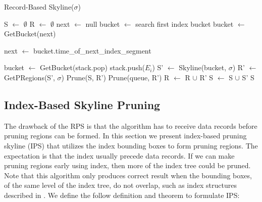 \begin{algorithm}[t]
\caption{Record-Based Skyline($\sigma$)} \label{alg:RBSkyline}
\begin{algorithmic}[1]

\STATE S $\gets$ $\emptyset$
\STATE R $\gets$ $\emptyset$
\REPEAT
    \STATE next $\gets$ null
        \STATE bucket $\gets$ search first index bucket
    \ELSE
        \STATE bucket $\gets$ GetBucket(next)
    \ENDIF

        \STATE next $\gets$ bucket.time\_of\_next\_index\_segment
    \ENDIF

            \STATE bucket $\gets$ GetBucket(stack.pop)
        \ENDIF
                    \STATE stack.push($E_i$)
                \ENDIF
            \ENDFOR
        \ELSE
            \STATE S' $\gets$ Skyline(bucket, $\sigma$)
            \STATE R' $\gets$ GetPRegions(S', $\sigma$)
            \STATE Prune(S, R')
            \STATE Prune(queue, R')
            \STATE R $\gets$ R $\cup$ R'
            \STATE S $\gets$ S $\cup$ S'
        \ENDIF
    \ENDWHILE
{}
\RETURN S
\end{algorithmic}
\end{algorithm}


\subsection{Index-Based Skyline Pruning}\label{sec-IPS}

The drawback of the RPS is that the algorithm has to receive data records before pruning regions can be formed. In this section we present index-based pruning skyline (IPS) that utilizes the index bounding boxes to form pruning regions. The expectation is that the index usually precede data records. If we can make pruning regions early using index, then more of the index tree could be pruned. Note that this algorithm only produces correct result when the bounding boxes, of the same level of the index tree, do not overlap, such as index structures described in \cite{DBLP:conf/vldb/SellisRF87}\cite{DBLP:journals/acta/FinkelB74}\cite{DBLP:conf/compgeom/Bentley90}. We define the follow definition and theorem to formulate IPS:


